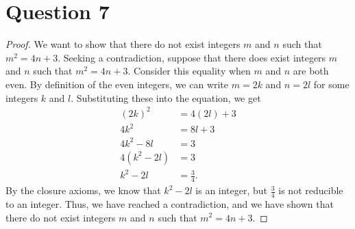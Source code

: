 \documentclass{article}
\begin{document}
\section*{Question 7}
\begin{proof}
    We want to show that there do not exist integers $m$ and $n$ such that $m^2 = 4n + 3$.
    Seeking a contradiction, suppose that there does exist integers $m$ and $n$ such that $m^2 = 4n + 3$.
    Consider this equality when $m$ and $n$ are both even.
    By definition of the even integers, we can write $m = 2k$ and $n = 2l$ for some integers $k$ and $l$.
    Substituting these into the equation, we get
    \begin{align*}
        (2k)^2 &= 4(2l) + 3 \\
        4k^2 &= 8l + 3 \\
        4k^2 - 8l &= 3 \\
        4(k^2 - 2l) &= 3 \\
        k^2 - 2l &= \frac{3}{4}.
    \end{align*}
    By the closure axioms, we know that $k^2 - 2l$ is an integer, but $\frac{3}{4}$ is not reducible to an integer.
    Thus, we have reached a contradiction, and we have shown that there do not exist integers $m$ and $n$ such that $m^2 = 4n + 3$.
\end{proof}
\end{document}
